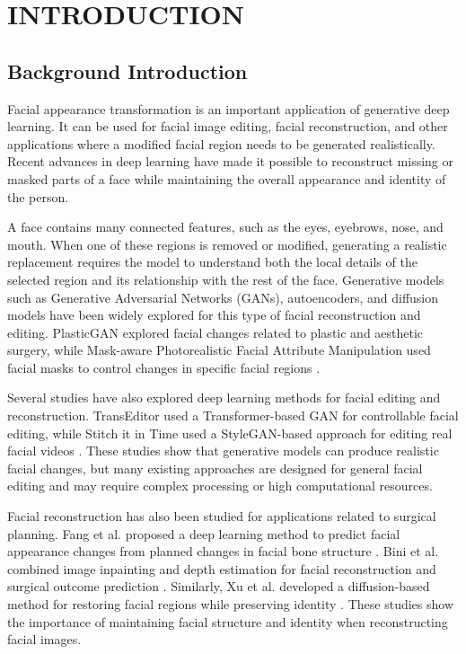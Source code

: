 \chapter{INTRODUCTION}
        \section{Background Introduction}


Facial appearance transformation is an important application of generative deep learning. It can be used for facial image editing, facial reconstruction, and other applications where a modified facial region needs to be generated realistically. Recent advances in deep learning have made it possible to reconstruct missing or masked parts of a face while maintaining the overall appearance and identity of the person.

\noindent A face contains many connected features, such as the eyes, eyebrows, nose, and mouth. When one of these regions is removed or modified, generating a realistic replacement requires the model to understand both the local details of the selected region and its relationship with the rest of the face. Generative models such as Generative Adversarial Networks (GANs), autoencoders, and diffusion models have been widely explored for this type of facial reconstruction and editing. PlasticGAN explored facial changes related to plastic and aesthetic surgery, while Mask-aware Photorealistic Facial Attribute Manipulation used facial masks to control changes in specific facial regions \cite{chandaliya2022plasticgan,sun2021maskaware}.

\noindent Several studies have also explored deep learning methods for facial editing and reconstruction. TransEditor used a Transformer-based GAN for controllable facial editing, while Stitch it in Time used a StyleGAN-based approach for editing real facial videos \cite{xu2022transeditor,tzaban2022stitch}. These studies show that generative models can produce realistic facial changes, but many existing approaches are designed for general facial editing and may require complex processing or high computational resources.

\noindent Facial reconstruction has also been studied for applications related to surgical planning. Fang et al. proposed a deep learning method to predict facial appearance changes from planned changes in facial bone structure \cite{fang2022acmt}. Bini et al. combined image inpainting and depth estimation for facial reconstruction and surgical outcome prediction \cite{bini2025facial}. Similarly, Xu et al. developed a diffusion-based method for restoring facial regions while preserving identity \cite{xu2024diffuse}. These studies show the importance of maintaining facial structure and identity when reconstructing facial images.

